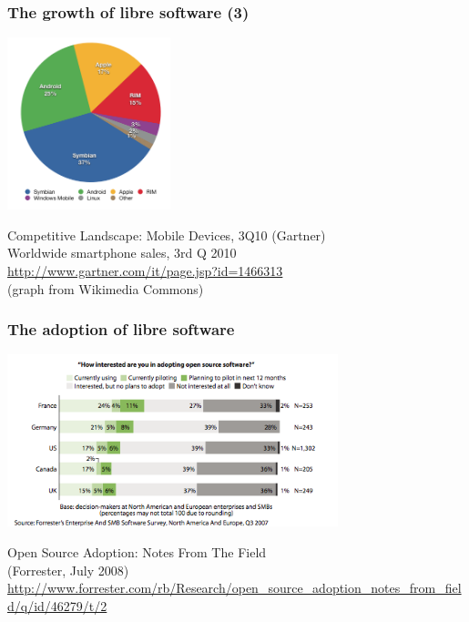 
\begin{frame}
\frametitle{The growth of libre software (3)}

\includegraphics[height=5cm]{smartphone-share-gartner-2010-q3}

\begin{flushright}
Competitive Landscape: Mobile Devices, 3Q10 (Gartner)\\
Worldwide smartphone sales, 3rd Q 2010 \\
{\small \url{http://www.gartner.com/it/page.jsp?id=1466313}} \\
(graph from Wikimedia Commons)
\end{flushright}
\end{frame}



\begin{frame}
\frametitle{The adoption of libre software}

\includegraphics[height=5cm]{adoption-interest-forrester-2007-q3}

\begin{flushright}
Open Source Adoption: Notes From The Field \\
(Forrester, July 2008) \\
{\small \url{http://www.forrester.com/rb/Research/open_source_adoption_notes_from_field/q/id/46279/t/2}} 
\end{flushright}

\end{frame}

